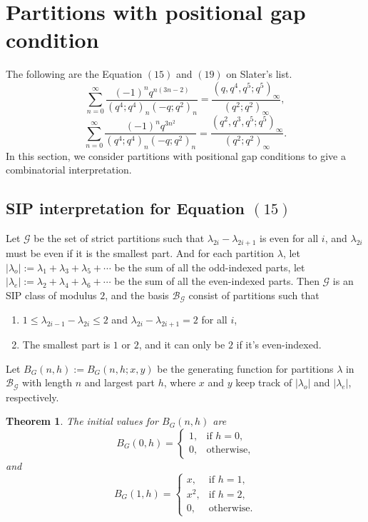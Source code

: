 \documentclass[12pt]{amsart}
\newtheorem{theorem}{Theorem}[section]
\theoremstyle{definition}
\theoremstyle{remark}
\numberwithin{equation}{section}
\begin{document}
\section{Partitions with positional gap condition}\label{sec:SlaterList6}
The following are the Equation $(15)$ and $(19)$ on Slater's list.
\begin{equation}\label{eq:Slater15}
\sum_{n=0}^{\infty}\frac{(-1)^nq^{n(3n-2)}}{(q^4;q^4)_{n}(-q;q^2)_{n}}=\frac{(q,q^4,q^5;q^5)_{\infty}}{(q^2;q^2)_{\infty}},
\end{equation}
\begin{equation}\label{eq:Slater19}
\sum_{n=0}^{\infty}\frac{(-1)^nq^{3n^2}}{(q^4;q^4)_{n}(-q;q^2)_{n}}=\frac{(q^2,q^3,q^5;q^5)_{\infty}}{(q^2;q^2)_{\infty}}.   
\end{equation}
In this section, we consider partitions with positional gap conditions to give a combinatorial interpretation.

\subsection{SIP interpretation for Equation $(15)$}

Let $\mathcal{G}$ be the set of strict partitions such that $\lambda_{2i}-\lambda_{2i+1}$ is even for all $i$, and $\lambda_{2i}$ must be even if it is the smallest part. And for each partition $\lambda$, let $|\lambda_{o}|:=\lambda_1+\lambda_3+\lambda_5+\cdots$ be the sum of all the odd-indexed parts, let $|\lambda_{e}|:=\lambda_2+\lambda_4+\lambda_6+\cdots$ be the sum of all the even-indexed parts. Then $\mathcal{G}$ is an SIP class of modulus $2$, and the basis $\mathcal{B}_{\mathcal{G}}$ consist of partitions such that
\begin{enumerate}
\item $1\leq\lambda_{2i-1}-\lambda_{2i}\leq2$ and $\lambda_{2i}-\lambda_{2i+1}=2$ for all $i$,
\item The smallest part is $1$ or $2$, and it can only be $2$ if it's even-indexed.
\end{enumerate}
Let $B_{G}(n,h):=B_G(n,h;x,y)$ be the generating function for partitions $\lambda$ in $\mathcal{B}_{\mathcal{G}}$ with length $n$ and largest part $h$, where $x$ and $y$ keep track of $|\lambda_{o}|$ and $|\lambda_{e}|$, respectively.
\begin{theorem}
The initial values for $B_G(n,h)$ are
\begin{equation}
B_G(0,h)=\begin{cases}
    1, & \text{if $h=0$}, \\
    0, & \text{otherwise},
\end{cases}    
\end{equation}
and
\begin{equation}
B_G(1,h)=\begin{cases}
    x, & \text{if $h=1$}, \\
    x^2, & \text{if $h=2$},\\
    0, & \text{otherwise}.
\end{cases}
\end{equation}
\end{theorem}
\end{document}
